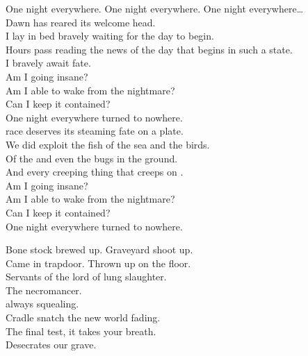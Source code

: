 


One night everywhere. One night everywhere. One night everywhere… \\

Dawn has reared its welcome head. \\
I lay in bed bravely waiting for the day to begin. \\

Hours pass reading the news of the day that begins in such a state. \\
I bravely await fate. \\

Am I going insane? \\
Am I able to wake from the nightmare? \\
Can I keep it contained? \\
One night everywhere turned to nowhere. \\

 race deserves its steaming fate on a plate. \\
We did exploit the fish of the sea and the birds. \\
Of the  and even the bugs in the ground. \\
And every creeping thing that creeps on . \\

Am I going insane? \\
Am I able to wake from the nightmare? \\
Can I keep it contained? \\
One night everywhere turned to nowhere. \\




Bone stock brewed up. Graveyard shoot up. \\
Came in trapdoor. Thrown up on the floor. \\
Servants of the lord of lung slaughter. \\
The necromancer. \\

 always squealing. \\
Cradle snatch the new world fading. \\
The final test, it takes your breath. \\
Desecrates our grave. \\

